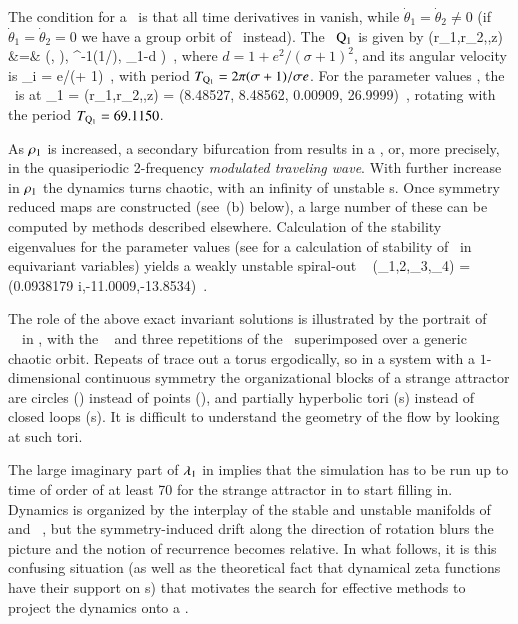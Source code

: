 \documentclass[final,number,sort&compress]{elsarticle}
\begin{document}
The condition for a \reqv\ is that all
time derivatives in  vanish, while
$\dot{\theta}_1=\dot{\theta}_2\neq 0$ (if
$\dot{\theta}_1=\dot{\theta}_2=0$ we have a group orbit
of \eqva\ instead).
The \reqv\
$\mathrm{Q}_{1}$ is given by
\bea
(r_1,r_2,\theta,z) &=&
\left(,  ),
     \cos^{-1}({1}/{}),  \rho_1-d
\right)
\,,
\label{eq:E1-PC}
\eea
where $d=1 + {e^2}/{(\sigma +1)^2}$, and
its angular velocity is
\beq
\dot{\theta}_{i}
= {\sigma e}/{(\sigma + 1)}
\,,
\label{eq:REQV1veloc}
\eeq
with period
${T_{{\mathrm{Q}_{1}}}}= 2\pi (\sigma + 1)/\sigma e$.
For the parameter values , the \reqv\ is at
\beq
\ssp_{\REQV{}1} = (r_1,r_2,\theta,z) =
     (8.48527,
      8.48562,
      0.00909,
      26.9999)
\,,
\label{eq:Q1}
\eeq
rotating with the period ${T_{{\mathrm{Q}_{1}}}}=69.1150$.

As $\rho_1$ is increased,  a secondary bifurcation from
 results in a \emph{\rpo} , or,
more precisely, in the quasiperiodic 2-frequency
\emph{modulated traveling wave}. With further
increase in $\rho_1$ the dynamics turns chaotic, with {an}
infinity of unstable {\rpo s}. Once symmetry reduced maps are
constructed (see \,(b) below), a large number of
these can be computed by methods described
elsewhere. Calculation of {the}
 stability eigenvalues for the parameter values
(see  for a calculation of stability of
\reqva\ in equi\-vari\-ant variables)
yields a weakly unstable spiral-out
\eqv\
\beq
(\eigExp_{1,2},\eigExp_3,\eigExp_4)
= (0.0938179  i,-11.0009,-13.8534)
\,.


The role of {the} above exact in\-vari\-ant solutions is illustrated by the
portrait of \cLf\ \statesp\ in  , with the
\reqv\ \REQV{}{1} and three repetitions of {the} \cycle{01} \rpo\
superimposed over a generic chaotic orbit. Repeats of
\cycle{01} {trace out a torus ergodically}, so in a system with
a $1$-dimensional continuous symmetry the organizational
blocks of a strange attractor are circles (\reqva) instead of
points (\eqva), and partially hyperbolic tori (\rpo s)
instead of closed loops (\po s). It is difficult to
understand the geometry of the flow by looking at such tori.

The large imaginary part of $\eigExp_{1}$ in
\refeq{eq:CLeREQBstab} implies that the simulation has to be
run up to time of order of at least 70 for the strange
attractor in \reffig{fig:CLE} to start filling in. Dynamics
is organized by the interplay of the stable and unstable
manifolds of \eqv\ \EQV{0} and \reqv\ \REQV{}{1}, but the
symmetry-induced drift along the direction of rotation blurs
the picture and the notion of recurrence becomes relative. In
what follows, it is this confusing situation (as well as the
theoretical fact\rf{Cvi07} that dynamical zeta functions have
their support on \rpo s) that motivates the search for
effective methods to project the dynamics onto a \reducedsp.
\end{document}
